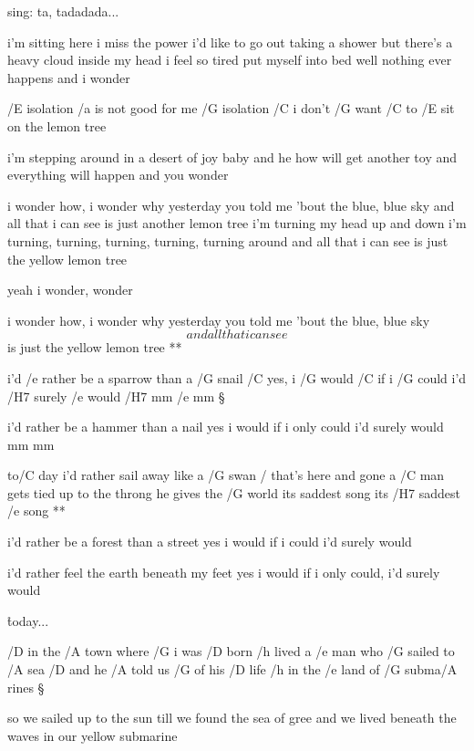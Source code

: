 sing: ta, tadadada... \s

i'm sitting here i miss the power
i'd like to go out taking a shower
but there's a heavy cloud inside my head
i feel so tired put myself into bed
well nothing ever happens and i wonder \s

/E isolation /a is not good for me
/G isolation /C i don't /G want /C to /E sit on the lemon tree \s

i'm stepping around in a desert of joy
baby and he how will get another toy
and everything will happen and you wonder


\songgg{}

\R  i wonder how, i wonder why
    yesterday you told me 'bout the blue, blue sky
    and all that i can see is just another lemon tree
    i'm turning my head up and down
    i'm turning, turning, turning, turning, turning around
    and all that i can see is just the yellow lemon tree \s

    yeah i wonder, wonder \s

    i wonder how, i wonder why
    yesterday you told me 'bout the blue, blue sky
    \[ and all that i can see \] 
    is just the yellow lemon tree **




i'd /e rather be a sparrow than a /G snail
/C yes, i /G would /C if i /G could i'd /H7 surely /e would /H7 mm /e mm \S

i'd rather be a hammer than a nail
yes i would if i only could i'd surely would mm mm

\R  to/C day i'd rather sail away like a /G swan
    / that's here and gone
    a /C man gets tied up to the throng
    he gives the /G world its saddest song
    its /H7 saddest /e song **

i'd rather be a forest than a street
yes i would if i could i'd surely would \s

i'd rather feel the earth beneath my feet
yes i would if i only could, i'd surely would

\r  today...




/D in the /A town where /G i was /D born
/h lived a /e man who /G sailed to /A sea
/D and he /A told us /G of his /D life
/h in the /e land of /G subma/A rines \S

so we sailed up to the sun
till we found the sea of gree
and we lived beneath the waves
in our yellow submarine

